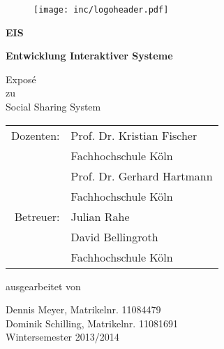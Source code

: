 
\begin{titlepage}

\begin{center}

\begin{figure}[!ht]
	\centering
		\texttt{[image: inc/logoheader.pdf]}
\end{figure}

\vspace{3.0cm}

\begin{Huge}
	\textbf{EIS}\\
\end{Huge}

\vspace{0.1cm}

\begin{huge}
	\textbf{Entwicklung Interaktiver Systeme}\\
\end{huge}

\vspace{0.8cm}

\begin{LARGE}
	Exposé\\
	\vspace{0.1cm}
	zu\\
	\vspace{0.1cm}
	Social Sharing System\\
\end{LARGE}

\vspace{2.5cm}

\begin{tabular}{rl}
      Dozenten:  &  Prof. Dr. Kristian Fischer\\
       			 &  \small Fachhochschule Köln \\[1.0em]
                 &  Prof. Dr. Gerhard Hartmann\\
       			 &  \small Fachhochschule Köln \\[1.0em]
      Betreuer:  &  Julian Rahe\\
				 &  David Bellingroth\\
       			 &  \small Fachhochschule Köln\\
\end{tabular}

\vspace{2.0cm}

\begin{large}
	ausgearbeitet von\\
	\vspace{0.2cm}
\end{large}

\begin{Large}
	Dennis Meyer, Matrikelnr. 11084479\\
	Dominik Schilling, Matrikelnr. 11081691\\
	\vspace{1cm}
	Wintersemester 2013/2014
\end{Large}

\end{center}

\end{titlepage}
